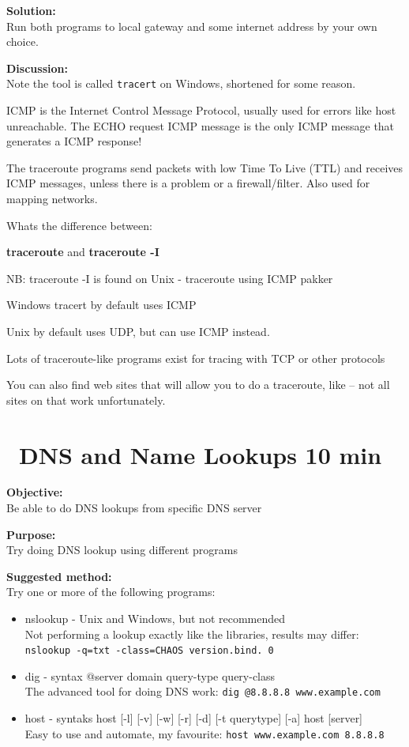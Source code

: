 \documentclass[a4paper,11pt,notitlepage]{report}
\begin{document}
{\bf Solution:}\\
Run both programs to local gateway and some internet address by your own choice.

{\bf Discussion:}\\
Note the tool is called  \verb+tracert+ on Windows, shortened for some reason.

ICMP is the Internet Control Message Protocol, usually used for errors like host unreachable. The ECHO request ICMP message is the only ICMP message that generates a ICMP response!

The traceroute programs send packets with low Time To Live (TTL) and receives ICMP messages, unless there is a problem or a firewall/filter. Also used for mapping networks.

Whats the difference between:
\begin{list2}
\item {\bfseries traceroute} and {\bfseries traceroute -I}
\item NB: traceroute -I is found on Unix - traceroute using ICMP pakker
\item Windows tracert by default uses ICMP
\item Unix by default uses UDP, but can use ICMP instead.
\item Lots of traceroute-like programs exist for tracing with TCP or other protocols
\end{list2}

You can also find web sites that will allow you to do a traceroute, like  -- not all sites on that work unfortunately.



\chapter{\faInfoCircle\ DNS and Name Lookups 10 min}
\label{ex:basic-dns-lookup}



{\bf Objective:}\\
Be able to do DNS lookups from specific DNS server

{\bf Purpose:}\\
Try doing DNS lookup using different programs

{\bf Suggested method:}\\
Try one or more of the following programs:
\begin{itemize}
\item nslookup - Unix and Windows, but not recommended\\
Not performing a lookup exactly like the libraries, results may differ:\\
\verb+nslookup -q=txt -class=CHAOS version.bind. 0+
\item dig - syntax @server domain query-type query-class\\
The advanced tool for doing DNS work: \verb+dig @8.8.8.8 www.example.com+
\item host - syntaks host [-l] [-v] [-w] [-r] [-d] [-t querytype] [-a] host [server]\\
Easy to use and automate, my favourite: \verb+host www.example.com 8.8.8.8+
\end{itemize}
\end{document}
